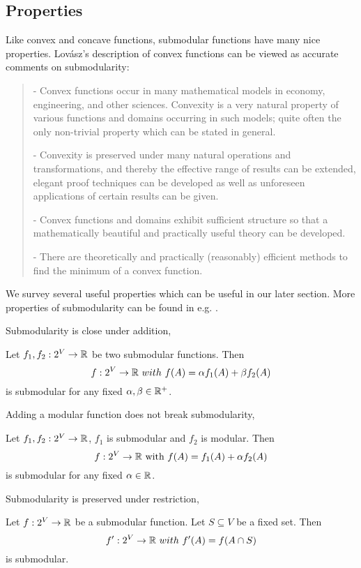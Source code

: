 \subsection{Properties}
Like convex and concave functions, submodular functions have many nice properties. Lov{\'a}sz's description of convex functions \cite{L83} can be viewed as accurate comments on submodularity:
\begin{quote}
 - Convex functions occur in many mathematical models in economy,
engineering, and other sciences. Convexity is a very natural property
of various functions and domains occurring in such models; quite
often the only non-trivial property which can be stated in general.

- Convexity is preserved under many natural operations and
transformations, and thereby the effective range of results can be
extended, elegant proof techniques can be developed as well as
unforeseen applications of certain results can be given.

- Convex functions and domains exhibit sufficient structure so that a
mathematically beautiful and practically useful theory can be
developed.

- There are theoretically and practically (reasonably) efficient methods
to find the minimum of a convex function.
\end{quote}

We survey several useful properties which can be useful in our later section. More properties of submodularity can be found in e.g. \cite{B14,F05}.





Submodularity is close under addition,
\begin{property}
  \label{prop:addition}
  Let $f_1, f_2: 2^V \rightarrow \mathbb{R}$ be two submodular functions. Then 
  $$f: 2^V\rightarrow \mathbb{R}~{with}~ f(A) = \alpha f_1(A) + \beta f_2(A)$$ 
is submodular for any fixed $\alpha, \beta \in \mathbb{R}^+$.
\end{property}


Adding a modular function does not break submodularity,
\begin{property}
  \label{prop:modular}
  Let $f_1, f_2: 2^V \rightarrow \mathbb{R}$, $f_1$ is submodular and $f_2$ is modular. Then
  $$f: 2^V \rightarrow \mathbb{R}~\text{with}~ f(A) = f_1(A) + \alpha f_2(A)$$
is submodular for any fixed $\alpha \in \mathbb{R}$.
\end{property}

Submodularity is preserved under restriction,
\begin{property}
  \label{prop:restriction}
  Let $f: 2^V \rightarrow \mathbb{R}$ be a submodular function. Let $S\subseteq V$ be a fixed set. Then
$$f':2^V \rightarrow \mathbb{R}~{with}~f'(A) = f(A\cap S)$$
is submodular.
\end{property}

